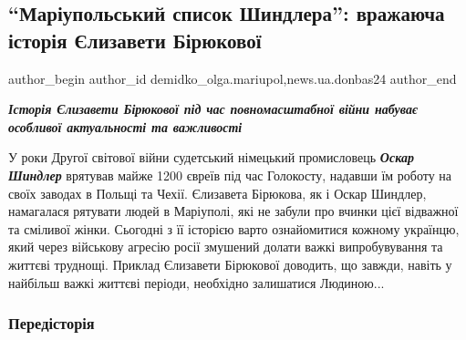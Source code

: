  
 
 
 
 
 
\subsection{\enquote{Маріупольський список Шиндлера}: вражаюча історія Єлизавети Бірюкової}
\label{sec:13_08_2022.stz.news.ua.donbas24.1.mrpl_spisok_shindlera_istoria_elizaveta_birjukova}
 
\ifcmt
 author_begin
   author_id demidko_olga.mariupol,news.ua.donbas24
 author_end
\fi


\begin{center}
\em\bfseries\Large
Історія Єлизавети Бірюкової під час повномасштабної війни набуває особливої актуальності та важливості 
\end{center}

У роки Другої світової війни судетський німецький промисловець
\textbf{\emph{Оскар Шиндлер}} врятував майже 1200 євреїв під час Голокосту,
надавши їм роботу на своїх заводах в Польщі та Чехії. Єлизавета Бірюкова, як і
Оскар Шиндлер, намагалася рятувати людей в Маріуполі, які не забули про вчинки
цієї відважної та сміливої жінки. Сьогодні з її історією варто ознайомитися
кожному українцю, який через військову агресію росії змушений долати важкі
випробувування та життєві труднощі. Приклад Єлизавети Бірюкової доводить, що
завжди, навіть у найбільш важкі життєві періоди, необхідно залишатися
Людиною... 

\subsubsection{Передісторія}

